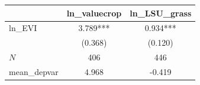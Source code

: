 {
\def\sym#1{\ifmmode^{#1}\else\(^{#1}\)\fi}
\begin{tabular}{l*{2}{c}}
\toprule
          &\multicolumn{1}{c}{ln\_valuecrop}&\multicolumn{1}{c}{ln\_LSU\_grass}\\
\midrule
ln\_EVI    &    3.789***&    0.934***\\
          &  (0.368)   &  (0.120)   \\
\midrule
\(N\)     &      406   &      446   \\
mean\_depvar&    4.968   &   -0.419   \\
\bottomrule
\end{tabular}
}
